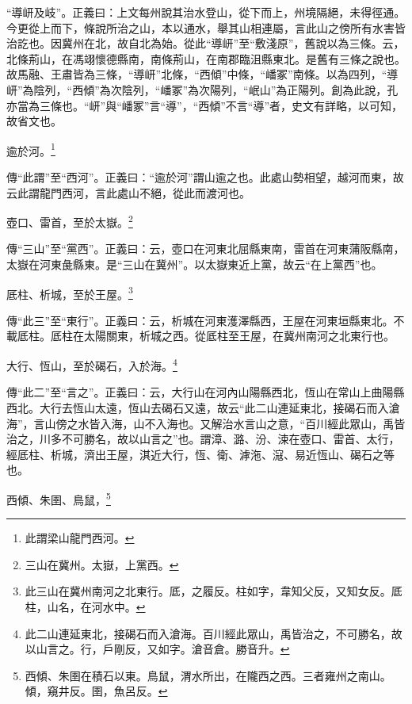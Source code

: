 {\noindent\shu{}\fzkt “導岍及岐”。正義曰：上文每州說其治水登山，從下而上，州境隔絕，未得徑通。今更從上而下，條說所治之山，本以通水，舉其山相連屬，言此山之傍所有水害皆治訖也。因冀州在北，故自北為始。從此“導岍”至“敷淺原”，舊說以為三條。云，北條荊山，在馮翊懷德縣南，南條荊山，在南郡臨沮縣東北。是舊有三條之說也。故馬融、王肅皆為三條，“導岍”北條，“西傾”中條，“嶓冢”南條。以為四列，“導岍”為陰列，“西傾”為次陰列，“嶓冢”為次陽列，“岷山”為正陽列。創為此說，孔亦當為三條也。“岍”與“嶓冢”言“導”，“西傾”不言“導”者，史文有詳略，以可知，故省文也。 \par}

逾於河。\footnote{此謂梁山龍門西河。}

{\noindent\zhuan{}\fzbyks 傳“此謂”至“西河”。正義曰：“逾於河”謂山逾之也。此處山勢相望，越河而東，故云此謂龍門西河，言此處山不絕，從此而渡河也。 \par}

壺口、雷首，至於太嶽。\footnote{三山在冀州。太嶽，上黨西。}

{\noindent\zhuan{}\fzbyks 傳“三山”至“黨西”。正義曰：云，壺口在河東北屈縣東南，雷首在河東蒲阪縣南，太嶽在河東彘縣東。是“三山在冀州”。以太嶽東近上黨，故云“在上黨西”也。 \par}

厎柱、析城，至於王屋。\footnote{此三山在冀州南河之北東行。厎，之履反。柱如字，韋知父反，又知女反。厎柱，山名，在河水中。}

{\noindent\zhuan{}\fzbyks 傳“此三”至“東行”。正義曰：云，析城在河東濩澤縣西，王屋在河東垣縣東北。不載厎柱。厎柱在太陽關東，析城之西。從厎柱至王屋，在冀州南河之北東行也。 \par}

大行、恆山，至於碣石，入於海。\footnote{此二山連延東北，接碣石而入滄海。百川經此眾山，禹皆治之，不可勝名，故以山言之。行，戶剛反，又如字。滄音倉。勝音升。}

{\noindent\zhuan{}\fzbyks 傳“此二”至“言之”。正義曰：云，大行山在河內山陽縣西北，恆山在常山上曲陽縣西北。大行去恆山太遠，恆山去碣石又遠，故云“此二山連延東北，接碣石而入滄海”，言山傍之水皆入海，山不入海也。又解治水言山之意，“百川經此眾山，禹皆治之，川多不可勝名，故以山言之”也。謂漳、潞、汾、涑在壺口、雷首、太行，經厎柱、析城，濟出王屋，淇近大行，恆、衛、滹沲、滱、易近恆山、碣石之等也。 \par}

西傾、朱圉、鳥鼠，\footnote{西傾、朱圉在積石以東。鳥鼠，渭水所出，在隴西之西。三者雍州之南山。傾，窺井反。圉，魚呂反。}

